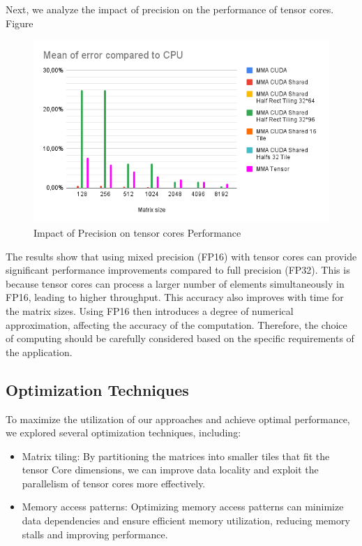 \documentclass[conference]{IEEEtran}
\begin{document}
  Next, we analyze the impact of precision on the performance of tensor cores. Figure %
  
  \begin{figure}[htbp]
    \centering
    \includegraphics[scale=0.42]{figures/Mean of error compared to CPU.png}
    \caption{Impact of Precision on tensor cores Performance}
    \label{fig:precision-impact}
  \end{figure}
  
  The results show that using mixed precision (FP16) with tensor cores can provide significant performance improvements compared to full precision (FP32).
  This is because tensor cores can process a larger number of elements simultaneously in FP16,
  leading to higher throughput. This accuracy also improves with time for the matrix sizes.
  Using FP16 then introduces a degree of numerical approximation, affecting the accuracy of the computation.
  Therefore, the choice of computing should be carefully considered based on the specific
  requirements of the application.
  
  \subsection{Optimization Techniques}\label{sec:optimization-techniques}
  
  To maximize the utilization of our approaches and achieve optimal performance, we explored several 
  optimization techniques, including:
  
  \begin{itemize}
    \item Matrix tiling: By partitioning the matrices
    into smaller tiles that fit the tensor Core dimensions, we can improve data locality 
    and exploit the parallelism of tensor cores more effectively.
    \item Memory access patterns: Optimizing memory access patterns can minimize data 
    dependencies and ensure efficient memory utilization, reducing memory stalls and improving 
    performance.
    
  \end{itemize}
  
\end{document}
